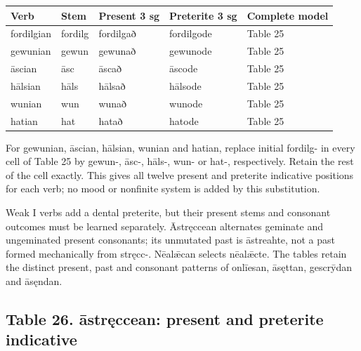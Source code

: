 \begin{tabular}{@{}>{\raggedright\arraybackslash}p{21.33mm}>{\raggedright\arraybackslash}p{21.33mm}>{\raggedright\arraybackslash}p{22.08mm}>{\raggedright\arraybackslash}p{25.17mm}>{\raggedright\arraybackslash}p{22.83mm}@{}}
\toprule
\textbf{Verb} & \textbf{Stem} & \textbf{Present 3 sg} & \textbf{Preterite 3 sg} & \textbf{Complete model} \\
\midrule
fordilgian & fordilg & fordilgað & fordilgode & Table 25 \\
gewunian & gewun & gewunað & gewunode & Table 25 \\
āscian & āsc & āscað & āscode & Table 25 \\
hālsian & hāls & hālsað & hālsode & Table 25 \\
wunian & wun & wunað & wunode & Table 25 \\
hatian & hat & hatað & hatode & Table 25 \\
\bottomrule
\end{tabular}
\par\endgroup

For gewunian, āscian, hālsian, wunian and hatian, replace initial fordilg- in every cell of Table 25 by gewun-, āsc-, hāls-, wun- or hat-, respectively. Retain the rest of the cell exactly. This gives all twelve present and preterite indicative positions for each verb; no mood or nonfinite system is added by this substitution.

Weak I verbs add a dental preterite, but their present stems and consonant outcomes must be learned separately. Āstręccean alternates geminate and ungeminated present consonants; its unmutated past is āstreahte, not a past formed mechanically from stręcc-. Nēalǣcan selects nēalǣcte. The tables retain the distinct present, past and consonant patterns of onlīesan, āsęttan, gescrȳdan and āsęndan.

\subsection*{Table 26. āstręccean: present and preterite indicative}


